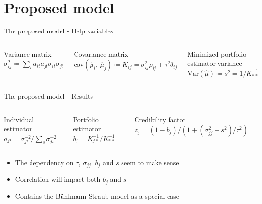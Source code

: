 \documentclass{beamer}
\begin{document}
\section{Proposed model}

\begin{frame}{The proposed model - Help variables}

\begin{columns}
    \begin{block}{Variance matrix}
    $\sigma_{ij}^2 \coloneqq \sum_t a_{it}a_{jt}\sigma_{it}\sigma_{jt}$
    \end{block}
    \begin{block}{Covariance matrix}
    $\text{cov}(\hat\mu_i,\, \hat\mu_j) \coloneqq K_{ij} = \sigma_{ij}^2\rho_{ij} + \tau^2\delta_{ij}$
    \end{block}
    \begin{block}{Minimized portfolio estimator variance}
    $\text{Var}(\hat\mu)\coloneqq s^2=1/K^{-1}_{\ast\ast}$
    \end{block}
\end{columns}

\end{frame}

\begin{frame}{The proposed model - Results}

\begin{columns}
    \begin{block}{Individual estimator}
    $a_{jt} = \sigma_{jt}^{-2}/\sum_s \sigma_{js}^{-2}$
    \end{block}
    \begin{block}{Portfolio estimator}
        $b_j = K^{-1}_{j\ast}/K^{-1}_{\ast\ast}$
    \end{block}
    \begin{block}{Credibility factor}
        $z_j = (1-b_j)/(1 + (\sigma_{jj}^2 - s^2)/\tau^2)$
    \end{block}
\end{columns}

\vspace{0.5cm}

\begin{itemize}
    \item The dependency on $\tau$, $\sigma_{jj}$, $b_j$ and $s$ seem to make sense
    \item Correlation will impact both $b_j$ and $s$
    \item Contains the Bühlmann-Straub model as a special case
\end{itemize}

\end{frame}
\end{document}
